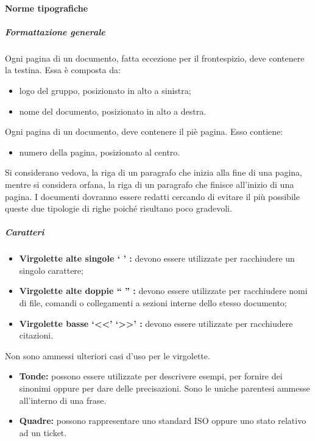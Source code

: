 \documentclass[../NormeProgetto.tex]{subfiles}
\begin{document}
	\paragraph{Norme tipografiche} \label{sec:Norme tipografiche}
		\subparagraph{Formattazione generale}
			Ogni pagina di un documento, fatta eccezione per il frontespizio, deve contenere la testina. Essa è composta da:
			\begin{itemize}
				\item logo del gruppo, posizionato in alto a sinistra;
				\item nome del documento, posizionato in alto a destra.
			\end{itemize}
			Ogni pagina di un documento, deve contenere il piè pagina. Esso contiene:
			\begin{itemize}
				\item numero della pagina, posizionato al centro.
			\end{itemize}
			Si considerano vedova, la riga di un paragrafo che inizia alla fine di una pagina, mentre si considera orfana, la riga di un paragrafo che finisce all'inizio di una pagina. I documenti dovranno essere redatti cercando di evitare il più possibile queste due tipologie di righe poiché risultano poco gradevoli. 
		\subparagraph{Caratteri}
			
			
			\begin{itemize}
				\item \textbf{Virgolette alte singole ` ' :} devono essere utilizzate per racchiudere un singolo carattere;
				\item \textbf{Virgolette alte doppie `` '' :} devono essere utilizzate per racchiudere nomi di file, comandi o collegamenti a sezioni interne dello stesso documento;
				\item \textbf{Virgolette basse `<<' `>>' :} devono essere utilizzate per racchiudere citazioni.
			\end{itemize}
			Non sono ammessi ulteriori casi d'uso per le virgolette.
			
			
			\begin{itemize}
				\item \textbf{Tonde:} possono essere utilizzate per descrivere esempi, per fornire dei sinonimi oppure per dare delle precisazioni. Sono le uniche parentesi ammesse all'interno di una frase.
				\item \textbf{Quadre:} possono rappresentare uno standard ISO oppure uno stato relativo ad un ticket\g. 
			\end{itemize}
			
\end{document}
